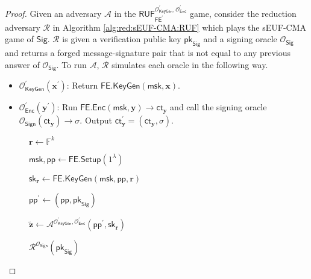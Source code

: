 \begin{proof}

Given an adversary $\mathcal{A}$ in the $\textsf{RUF}^{\mathcal{O}_{\textsf{KeyGen}}^\prime, \mathcal{O}_{\textsf{Enc}}^\prime}_{\textsf{FE}^\prime}$ game, consider the reduction adversary $\mathcal{R}$ in Algorithm \ref{alg:red:sEUF-CMA:RUF} which plays the \textsf{sEUF-CMA} game of $\textsf{Sig}$. $\mathcal{R}$ is given a verification public key $\textsf{pk}_{\textsf{Sig}}$ and a signing oracle $\mathcal{O}_{\textsf{Sig}}$ and returns a forged message-signature pair that is not equal to any previous answer of $\mathcal{O}_{\textsf{Sig}}$. To run $\mathcal{A}$, $\mathcal{R}$ simulates each oracle in the following way.

\begin{itemize}
	\item $\mathcal{O}_{\textsf{KeyGen}}^\prime(\mathbf{x}^\prime)$: Return $\textsf{FE.KeyGen}(\textsf{msk}, \mathbf{x})$.

	\item $\mathcal{O}_{\textsf{Enc}}^\prime(\mathbf{y}^\prime)$: Run $\textsf{FE.Enc}(\textsf{msk}, \mathbf{y}) \to \textsf{ct}_{\mathbf{y}}$ and call the signing oracle $\mathcal{O}_{\textsf{Sign}}(\textsf{ct}_{\mathbf{y}}) \to \sigma$. Output $\textsf{ct}_{\mathbf{y}}^\prime = (\textsf{ct}_{\mathbf{y}}, \sigma)$.
\end{itemize}

\begin{figure}[h]
\centering
	
	\begin{minipage}[t]{0.5\linewidth}
	\centering
	\begin{algorithm}[H]
	\caption{$\mathcal{R}^{\mathcal{O}_{\textsf{Sign}}}( \textsf{pk}_{\textsf{Sig}} )$}
	\label{alg:red:sEUF-CMA:RUF}
	\begin{algorithmic}[1]

		\State $\mathbf{r} \gets \mathbb{F}^k$

		\State $\textsf{msk}, \textsf{pp} \gets \textsf{FE.Setup}(1^\lambda)$

		\State $\textsf{sk}_{\mathbf{r}} \gets \textsf{FE.KeyGen}(\textsf{msk}, \textsf{pp}, \mathbf{r})$

		\State $\textsf{pp}^\prime \gets (\textsf{pp}, \textsf{pk}_{\textsf{Sig}})$

		\State $\mathbf{\tilde{z}} \gets {\mathcal{A}}^{\mathcal{O}_{\textsf{KeyGen}}^\prime, \mathcal{O}_{\textsf{Enc}}^\prime } (\textsf{pp}^\prime, \textsf{sk}_{\mathbf{r}})$ \label{alg:red:sEUF-CMA:RUF:A}


\end{algorithmic}
\end{algorithm}
\end{minipage}
\end{figure}
\end{proof}
